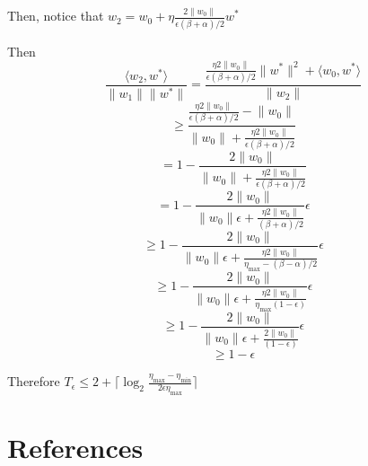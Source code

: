 \documentclass{article}
\begin{document}
Then,
notice that $w_2 = w_0 +\eta \frac{2  \lVert w_0 \rVert}{\epsilon (\beta + \alpha)/2} w^*$

Then 
$$
\frac{\langle w_2, w^* \rangle}{\lVert w_1 \rVert \lVert w^* \rVert} = \frac{
\frac{\eta 2  \lVert w_0 \rVert}{\epsilon (\beta + \alpha)/2} \lVert w^* \lVert ^2 + \langle w_0, w^* \rangle}{\lVert w_2 \rVert}
$$ 
$$
\geq \frac{\frac{\eta 2  \lVert w_0 \rVert}{\epsilon (\beta + \alpha)/2} - \lVert w_0 \rVert}{\lVert w_0 \rVert +\frac{\eta 2  \lVert w_0 \rVert}{\epsilon (\beta + \alpha)/2} }
$$
$$
= 1 - \frac{2 \lVert w_0  \rVert}{\lVert w_0 \rVert +\frac{\eta 2  \lVert w_0 \rVert}{\epsilon (\beta + \alpha)/2} }
$$
$$
= 1 - \frac{2\lVert w_0 \rVert}{\lVert w_0  \rVert \epsilon + \frac{\eta 2  \lVert w_0 \rVert}{(\beta + \alpha)/2} } \epsilon
$$
$$
\geq  1 - \frac{2\lVert w_0 \rVert}{\lVert w_0  \rVert \epsilon + \frac{\eta 2  \lVert w_0 \rVert}{\eta_{\max} - (\beta - \alpha) / 2} } \epsilon
$$
$$
\geq  1 - \frac{2\lVert w_0 \rVert}{\lVert w_0  \rVert \epsilon + \frac{\eta 2  \lVert w_0 \rVert}{\eta_{\max} (1-\epsilon)} } \epsilon
$$
$$
\geq 1 - \frac{2\lVert w_0 \rVert}{\lVert w_0  \rVert \epsilon + \frac{ 2  \lVert w_0 \rVert}{(1-\epsilon)} } \epsilon
$$
$$
\geq 1 - \epsilon
$$

Therefore 
$T_\epsilon \leq  2 + \lceil \log_2 \frac{\eta_{\max} - \eta_{\min}}{2\epsilon\eta_{\max}}  \rceil$


\section*{References}



\small


\end{document}
